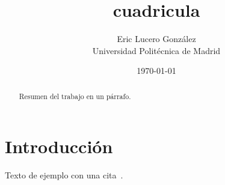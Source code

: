 \documentclass[11pt,a4paper]{article}
\title{cuadricula}
\author{Eric Lucero González\\ \small Universidad Politécnica de Madrid}
\date{\today}
\begin{document}
\maketitle

\begin{abstract}
  Resumen del trabajo en un párrafo.
\end{abstract}

\section{Introducción}
\label{sec:intro}

Texto de ejemplo con una cita~\parencite{ejemplo2026}.

\printbibliography
\end{document}
